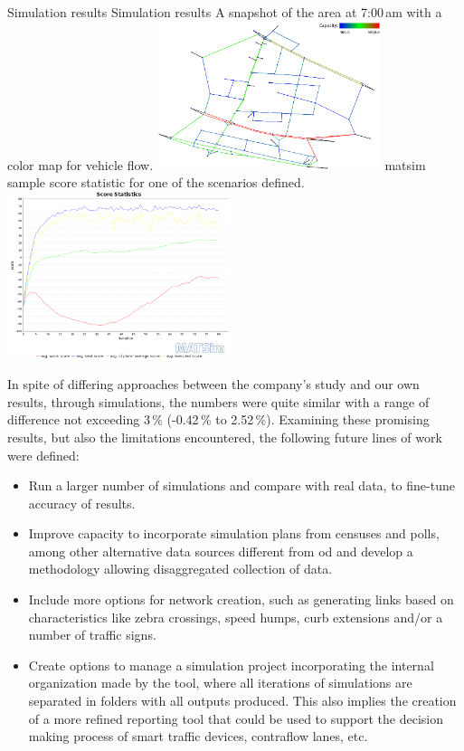 \createfigure%
{Simulation results}%
{Simulation results}%
{\label{fig:caracasB}}%
{%
 \createsubfigure%
 {A snapshot of the area at 7:00\,am  with a color map for vehicle flow.}
 {\includegraphics[width=0.49\textwidth, angle=0]{./scenarios/figures/caracasB1.png}}
 {\label{fig:caracasBleft}}
\createsubfigure%
 {\gls{matsim} sample score statistic for one of the scenarios defined.}
 {\includegraphics[width=0.49\textwidth, angle=0]{./scenarios/figures/caracasB2.png}}
 {\label{fig:caracasBright}}
}%
{}

In spite of differing approaches between the company's study and our own results, through simulations, the numbers were quite similar with a range of difference not exceeding 3\,\% (-0.42\,\% to 2.52\,\%). Examining these promising results, but also the limitations encountered, the following future lines of work were defined:

\begin{itemize}\styleItemize
\item Run a larger number of simulations and compare with real data, to fine-tune accuracy of results.

\item Improve capacity to incorporate simulation plans from censuses and polls, among other alternative data sources different from \gls{od} and develop a methodology allowing disaggregated collection of data.

\item Include more options for network creation, such as generating links based on characteristics like zebra crossings, speed humps, curb extensions and/or a number of traffic signs.

\item Create options to manage a simulation project incorporating the internal organization made by the tool, where all iterations of simulations are separated in folders with all outputs produced. This also implies the creation of a more refined reporting tool that could be used to support the decision making process of smart traffic devices, contraflow lanes, etc.
\end{itemize}


